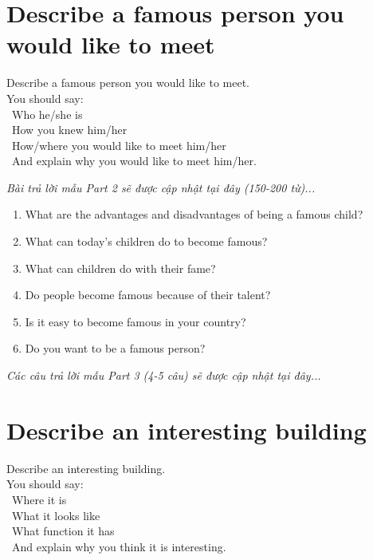 \section{Describe a famous person you would like to meet}
\begin{ieltsprompt}
Describe a famous person you would like to meet. \\
You should say: \\
\textbullet\ Who he/she is \\
\textbullet\ How you knew him/her \\
\textbullet\ How/where you would like to meet him/her \\
\textbullet\ And explain why you would like to meet him/her. \\
\end{ieltsprompt}

\vspace{1em}
\textit{Bài trả lời mẫu Part 2 sẽ được cập nhật tại đây (150-200 từ)...}
\vspace{2em}

\begin{ieltsprompt}
\begin{enumerate}[itemsep=4pt]
    \item What are the advantages and disadvantages of being a famous child?
    \item What can today's children do to become famous?
    \item What can children do with their fame?
    \item Do people become famous because of their talent?
    \item Is it easy to become famous in your country?
    \item Do you want to be a famous person?
\end{enumerate}
\end{ieltsprompt}

\vspace{1em}
\textit{Các câu trả lời mẫu Part 3 (4-5 câu) sẽ được cập nhật tại đây...}
\vspace{2em}

\section{Describe an interesting building}
\begin{ieltsprompt}
Describe an interesting building. \\
You should say: \\
\textbullet\ Where it is \\
\textbullet\ What it looks like \\
\textbullet\ What function it has \\
\textbullet\ And explain why you think it is interesting. \\
\end{ieltsprompt}

